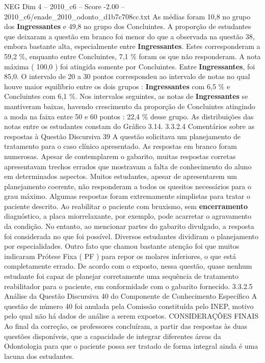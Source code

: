 \begin{textsample}{NEG Dim 4 – 2010\_c6 – Score -2.00 – 2010\_c6/enade\_2010\_odonto\_d1b7c708cc.txt}
As médias foram 10,8 no grupo dos \textbf{Ingressantes} e 49,8 no grupo dos Concluintes.
A proporção de estudantes que deixaram a questão em branco foi menor do que a observada na questão 38, embora bastante alta, especialmente entre \textbf{Ingressantes}.
Estes corresponderam a 59,2 \%, enquanto entre Concluintes, 7,1 \% foram os que não responderam.
A nota máxima ( 100,0 ) foi atingida somente por Concluintes.
Entre \textbf{Ingressantes}, foi 85,0.
O intervalo de 20 a 30 pontos correspondeu ao intervalo de notas no qual houve maior equilíbrio entre os dois grupos : \textbf{Ingressantes} com 6,5 \% e Concluintes com 6,1 \%.
Nos intervalos seguintes, as notas de \textbf{Ingressantes} se mantiveram baixas, havendo crescimento da proporção de Concluintes atingindo a moda na faixa entre 50 e 60 pontos : 22,4 \% desse grupo.
As distribuições das notas entre os estudantes constam do Gráfico 3.14. 3.3.2.4 Comentários sobre as respostas à Questão Discursiva 39 A questão solicitava um planejamento de tratamento para o caso clínico apresentado.
As respostas em branco foram numerosas.
Apesar de contemplarem o gabarito, muitas respostas corretas apresentavam trechos errados que mostravam a falta de conhecimento do aluno em determinados aspectos.
Muitos estudantes, apesar de apresentarem um planejamento coerente, não responderam a todos os quesitos necessários para o grau máximo.
Algumas respostas foram extremamente simplistas para tratar o paciente descrito.
Ao reabilitar o paciente com bruxismo, sem \textbf{encerramento} diagnóstico, a placa miorrelaxante, por exemplo, pode acarretar o agravamento da condição.
No entanto, ao mencionar partes do gabarito divulgado, a resposta foi considerada no que foi possível.
Diversos estudantes dividiram o planejamento por especialidades.
Outro fato que chamou bastante atenção foi que muitos indicaram Prótese Fixa ( PF ) para repor os molares inferiores, o que está completamente errado.
De acordo com o exposto, nessa questão, quase nenhum estudante foi capaz de planejar corretamente uma sequência de tratamento reabilitador para o paciente, em conformidade com o gabarito fornecido. 3.3.2.5 Análise da Questão Discursiva 40 do Componente de Conhecimento Específico A questão de número 40 foi anulada pela Comissão constituída pelo INEP, motivo pelo qual não há dados de análise a serem expostos.
CONSIDERAÇÕES FINAIS Ao final da correção, os professores concluíram, a partir das respostas às duas questões disponíveis, que a capacidade de integrar diferentes áreas da Odontologia para que o paciente possa ser tratado de forma integral ainda é uma lacuna dos estudantes.

\end{textsample}
